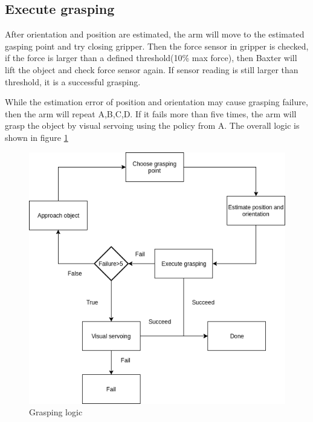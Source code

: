 \documentclass[a4paper, 10pt, conference]{ieeeconf}      %
\begin{document}
\subsection{Execute grasping} 
After orientation and position are estimated, the arm will move to the estimated gasping point and try closing gripper. Then the force sensor in gripper is checked, if the force is larger than a defined threshold(10\% max force), then Baxter will lift the object and check force sensor again. If sensor reading is still larger than threshold, it is a successful grasping.

While the estimation error of position and orientation may cause grasping failure, then the arm will repeat A,B,C,D. If it fails more than five times, the arm will grasp the object by visual servoing using the policy from A. The overall logic is shown in figure \ref{fig:logic}
\begin{figure}[!htb]
	\centering
	\includegraphics[width=.8\linewidth]{logic}
	\caption{\label{fig:logic}Grasping logic}
\end{figure}
\end{document}
